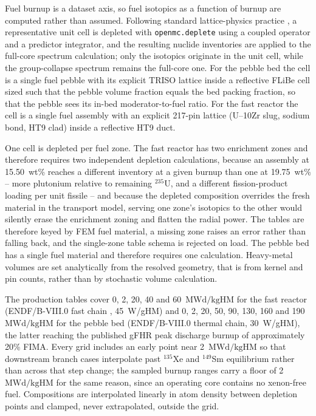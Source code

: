 \documentclass[preprint,12pt]{elsarticle}
\newcommand{\MWdkg}{\mathrm{MWd/kgHM}}
\begin{document}
Fuel burnup is a dataset axis, so fuel isotopics as a function of burnup are
computed rather than assumed. Following standard lattice-physics practice
\citep{scale}, a representative unit cell is depleted with
\texttt{openmc.deplete} \citep{romano2021} using a coupled operator and a
predictor integrator, and the resulting nuclide
inventories are applied to the full-core spectrum calculation; only the
isotopics originate in the unit cell, while the group-collapse spectrum remains
the full-core one. For the pebble bed the cell is a single fuel pebble with its
explicit TRISO lattice inside a reflective FLiBe cell sized such that the pebble
volume fraction equals the bed packing fraction, so that the pebble sees its
in-bed moderator-to-fuel ratio. For the fast reactor the cell is a single fuel
assembly with an explicit 217-pin lattice (U--10Zr slug, sodium bond, HT9 clad)
inside a reflective HT9 duct.

One cell is depleted per fuel zone. The fast reactor has two enrichment zones
and therefore requires two independent depletion calculations, because an
assembly at 15.50~wt\% reaches a different inventory at a given burnup than one
at 19.75~wt\% -- more plutonium relative to remaining $^{235}$U, and a
different fission-product loading per unit fissile -- and because the depleted
composition overrides the fresh material in the transport model, serving one
zone's isotopics to the other would silently erase the enrichment zoning and
flatten the radial power. The tables are therefore keyed by FEM fuel material,
a missing zone raises an error rather than falling back, and the single-zone
table schema is rejected on load. The pebble bed has a single fuel material and
therefore requires one calculation. Heavy-metal volumes are set analytically
from the resolved geometry, that is from kernel and pin counts, rather than by
stochastic volume calculation.

The production tables cover 0, 2, 20, 40 and 60~$\MWdkg$ for the fast reactor
(ENDF/B-VIII.0 fast chain \citep{brown2018}, 45~W/gHM) and 0, 2, 20, 50, 90,
130, 160 and
190~$\MWdkg$ for the pebble bed (ENDF/B-VIII.0 thermal chain, 30~W/gHM), the
latter reaching the published gFHR peak discharge burnup of approximately 20\%
FIMA. Every grid includes an early point near 2~$\MWdkg$ so that downstream
branch cases interpolate past $^{135}$Xe and $^{149}$Sm equilibrium rather than
across that step change; the sampled burnup ranges carry a floor of
2~$\MWdkg$ for the same reason, since an operating core contains no
xenon-free fuel. Compositions are interpolated linearly in atom density between
depletion points and clamped, never extrapolated, outside the grid.
\end{document}

